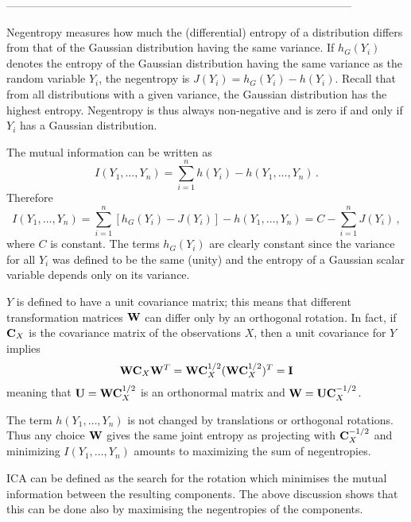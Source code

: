 \documentclass[10pt]{article}
\begin{document}
\begin{enumerate}
---------------------------------------------------------------------------------------------

Negentropy measures how much the (differential) entropy of a distribution
  differs from that of the Gaussian distribution having the same
  variance.  If $h_G(Y_i)$ denotes the entropy of the Gaussian
  distribution having the same variance as the random variable $Y_i$,
  the negentropy is $J(Y_i) = h_G(Y_i) - h(Y_i)$.  Recall that from
  all distributions with a given variance, the Gaussian distribution
  has the highest entropy.  Negentropy is thus always non-negative and
  is zero if and only if $Y_i$ has a Gaussian distribution.

  The mutual information can be written as $$I(Y_1, \ldots, Y_n) =
  \sum_{i=1}^n h(Y_i) - h(Y_1, \ldots, Y_n) \, .$$ Therefore $$I(Y_1,
  \ldots, Y_n) = \sum_{i=1}^n [h_G(Y_i) - J(Y_i)] - h(Y_1, \ldots,
  Y_n) = C - \sum_{i=1}^n J(Y_i) \, ,$$ where $C$ is constant.  The
  terms $h_G(Y_i)$ are clearly constant since the variance for all
  $Y_i$ was defined to be the same (unity) and the entropy of a Gaussian
  scalar variable depends only on its variance.

  $Y$ is defined to have a unit covariance matrix; this means that
  different transformation matrices ${\bf W}$ can differ only by an
  orthogonal rotation. In fact, if ${\bf C}_X$ is the covariance matrix of the
  observations $X$, then a unit covariance for $Y$ implies  
  \begin{equation*}
    {\bf W} {\bf C}_X {\bf W}^T =  { \bf W} {\bf C}_X^{1/2} ( {\bf W} {\bf C}_X^{1/2} )^T =
    {\bf I}  
  \end{equation*}
  meaning that ${\bf U} = { \bf W} {\bf C}_X^{1/2}$ is an orthonormal matrix and
  ${ \bf W} = {\bf U} {\bf C}_X^{-1/2}$.

  The term $h(Y_1, \ldots, Y_n)$ is not changed by translations or orthogonal rotations.
  Thus any choice ${ \bf W}$ gives the same joint entropy as projecting with ${\bf C}_X^{-1/2}$
  and minimizing $I(Y_1, \ldots, Y_n)$ amounts to maximizing the sum of negentropies.

  ICA can be defined as the search for the rotation which minimises
  the mutual information between the resulting components.  The above
  discussion shows that this can be done also by
  maximising the negentropies of the components.



\end{enumerate}
\end{document}

